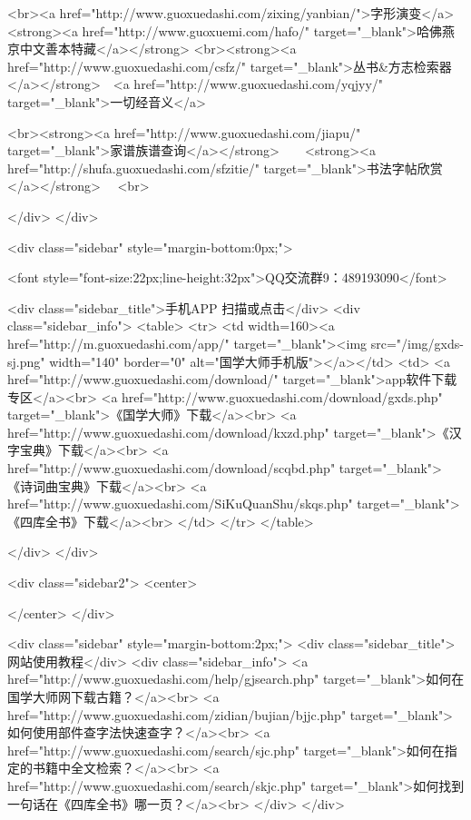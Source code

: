 <br><a href="http://www.guoxuedashi.com/zixing/yanbian/">字形演变</a>　　<strong><a href="http://www.guoxuemi.com/hafo/" target="_blank">哈佛燕京中文善本特藏</a></strong>
<br><strong><a href="http://www.guoxuedashi.com/csfz/" target="_blank">丛书&方志检索器</a></strong>　<a href="http://www.guoxuedashi.com/yqjyy/" target="_blank">一切经音义</a>　　

<br><strong><a href="http://www.guoxuedashi.com/jiapu/" target="_blank">家谱族谱查询</a></strong>　　<strong><a href="http://shufa.guoxuedashi.com/sfzitie/" target="_blank">书法字帖欣赏</a></strong>　
<br>

</div>
</div>


<div class="sidebar" style="margin-bottom:0px;">

<font style="font-size:22px;line-height:32px">QQ交流群9：489193090</font>


<div class="sidebar_title">手机APP 扫描或点击</div>
<div class="sidebar_info">
<table>
<tr>
	<td width=160><a href="http://m.guoxuedashi.com/app/" target="_blank"><img src="/img/gxds-sj.png" width="140"  border="0" alt="国学大师手机版"></a></td>
	<td>
<a href="http://www.guoxuedashi.com/download/" target="_blank">app软件下载专区</a><br>
<a href="http://www.guoxuedashi.com/download/gxds.php" target="_blank">《国学大师》下载</a><br>
<a href="http://www.guoxuedashi.com/download/kxzd.php" target="_blank">《汉字宝典》下载</a><br>
<a href="http://www.guoxuedashi.com/download/scqbd.php" target="_blank">《诗词曲宝典》下载</a><br>
<a href="http://www.guoxuedashi.com/SiKuQuanShu/skqs.php" target="_blank">《四库全书》下载</a><br>
</td>
</tr>
</table>

</div>
</div>


<div class="sidebar2">
<center>


</center>
</div>

<div class="sidebar"  style="margin-bottom:2px;">
<div class="sidebar_title">网站使用教程</div>
<div class="sidebar_info">
<a href="http://www.guoxuedashi.com/help/gjsearch.php" target="_blank">如何在国学大师网下载古籍？</a><br>
<a href="http://www.guoxuedashi.com/zidian/bujian/bjjc.php" target="_blank">如何使用部件查字法快速查字？</a><br>
<a href="http://www.guoxuedashi.com/search/sjc.php" target="_blank">如何在指定的书籍中全文检索？</a><br>
<a href="http://www.guoxuedashi.com/search/skjc.php" target="_blank">如何找到一句话在《四库全书》哪一页？</a><br>
</div>
</div>


